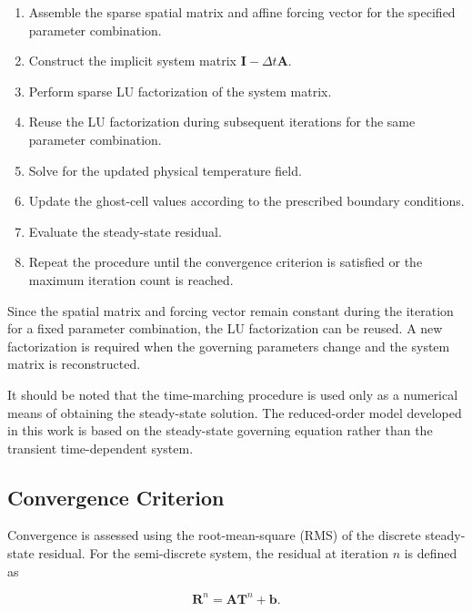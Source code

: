 \begin{enumerate}
    \item Assemble the sparse spatial matrix and affine
    forcing vector for the specified parameter combination.

    \item Construct the implicit system matrix
    $\mathbf{I}-\Delta t\mathbf{A}$.

    \item Perform sparse LU factorization of the system matrix.

    \item Reuse the LU factorization during subsequent
    iterations for the same parameter combination.

    \item Solve for the updated physical temperature field.

    \item Update the ghost-cell values according to the
    prescribed boundary conditions.

    \item Evaluate the steady-state residual.

    \item Repeat the procedure until the convergence
    criterion is satisfied or the maximum iteration count
    is reached.
\end{enumerate}

Since the spatial matrix and forcing vector remain constant
during the iteration for a fixed parameter combination,
the LU factorization can be reused. A new factorization
is required when the governing parameters change and
the system matrix is reconstructed.

It should be noted that the time-marching procedure is
used only as a numerical means of obtaining the steady-state
solution. The reduced-order model developed in this work
is based on the steady-state governing equation rather
than the transient time-dependent system.


\subsection{Convergence Criterion}

Convergence is assessed using the root-mean-square (RMS)
of the discrete steady-state residual. For the semi-discrete
system, the residual at iteration $n$ is defined as

\begin{equation}
    \mathbf{R}^{n}
    =
    \mathbf{A}\mathbf{T}^{n}+\mathbf{b}.
\end{equation}

